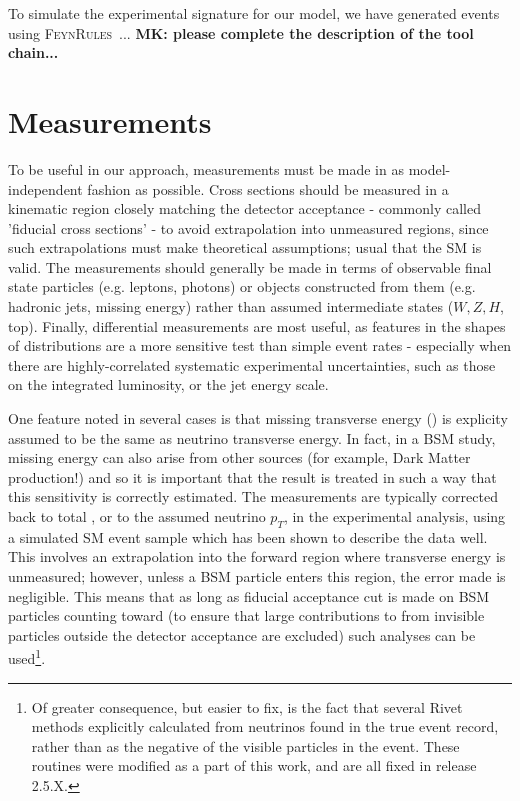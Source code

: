 \documentclass[floatfix]{article}
\begin{document}
To simulate the experimental signature for our model, we have generated events using \textsc{FeynRules}~\cite{Alloul:2013bka}... {\bf MK: please complete the description of the tool chain...}

\section{Measurements}\label{sec:measurements}

To be useful in our approach, measurements must be made in as model-independent fashion as possible. 
Cross sections should be measured in a kinematic region closely matching the detector acceptance - commonly called 
'fiducial cross sections' - to avoid extrapolation into unmeasured regions, since such extrapolations must make 
theoretical assumptions; usual that the SM is valid. The measurements should generally be made in terms of observable final
state particles (e.g. leptons, photons) or objects constructed from them (e.g. hadronic jets, missing energy) 
rather than assumed intermediate states ($W, Z, H$, top). Finally, differential measurements are most useful, as features
in the shapes of distributions are a more sensitive test than simple event rates - especially when there are
highly-correlated systematic experimental uncertainties, such as those on the integrated luminosity, or the jet energy scale.

One feature noted in several cases is that missing transverse energy (\MET) is 
explicity assumed to be the same as neutrino transverse energy. In fact, in a BSM study, missing energy can also 
arise from other sources (for example, Dark Matter production!) and so it is important that the result is treated in such a 
way that this sensitivity is correctly estimated. The measurements are typically corrected back to total \MET, 
or to the assumed neutrino $p_T$, in the experimental analysis, using a simulated SM event sample which has been shown to describe
the data well. This involves an extrapolation into the forward 
region where transverse energy is unmeasured; however, unless a BSM particle enters this region, the error made is 
negligible. This means that as long as fiducial acceptance cut is made on BSM particles counting toward \MET (to ensure that 
large contributions to \MET 
from invisible particles outside the detector acceptance are excluded) such analyses can be 
used\footnote{Of greater consequence, but easier to fix, is the fact that several Rivet methods explicitly calculated \MET
from neutrinos found in the true event record, rather than as the negative of the visible particles in the event. These 
routines were modified as a part of this work, and are all fixed in release 2.5.X.}.
\end{document}
